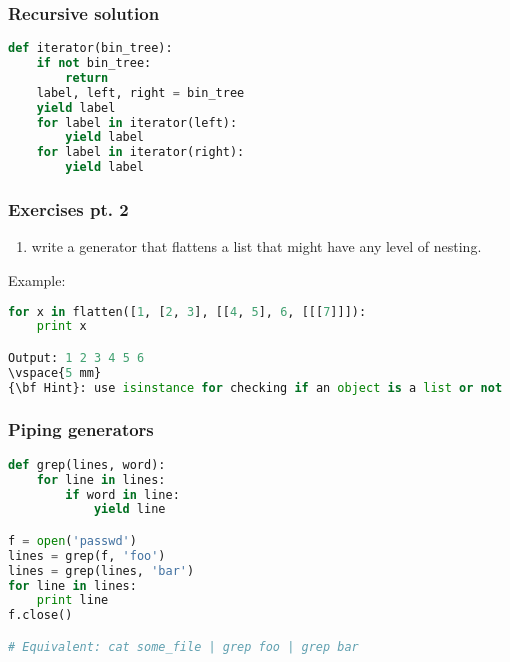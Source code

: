 \documentclass{beamer}
\begin{document}
\begin{frame}[fragile]
\frametitle{Recursive solution}
\begin{lstlisting}[language=python]
def iterator(bin_tree):
    if not bin_tree:
        return
    label, left, right = bin_tree
    yield label
    for label in iterator(left):
        yield label
    for label in iterator(right):
        yield label
\end{lstlisting}
\end{frame}

\begin{frame}[fragile]
\frametitle{Exercises pt. 2}
\begin{enumerate}
  \item write a generator that flattens a list that might have any level of nesting.
\end{enumerate}
Example:
\begin{lstlisting}[language=python]
for x in flatten([1, [2, 3], [[4, 5], 6, [[[7]]]):
    print x

Output: 1 2 3 4 5 6
\vspace{5 mm}
{\bf Hint}: use isinstance for checking if an object is a list or not
\end{lstlisting}
\end{frame}





\begin{frame}[fragile]
\frametitle{Piping generators}
\begin{lstlisting}[language=python]
def grep(lines, word):
    for line in lines:
        if word in line:
            yield line

f = open('passwd')
lines = grep(f, 'foo')
lines = grep(lines, 'bar')
for line in lines:
    print line
f.close()

# Equivalent: cat some_file | grep foo | grep bar
\end{lstlisting}
\end{frame}
\end{document}
